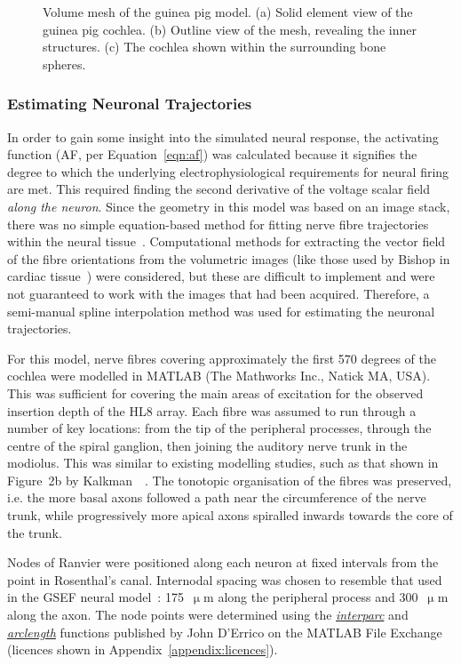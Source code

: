 \begin{figure}
    \caption[Volume mesh of the guinea pig model]{Volume mesh of the guinea pig
    model. (a) Solid element view of the guinea pig cochlea. (b) Outline
    view of the mesh, revealing the inner structures. (c) The cochlea shown
    within the surrounding bone spheres.}
	\label{fig:gp_mesh}
\end{figure}

\subsubsection{Estimating Neuronal Trajectories}

In order to gain some insight into the simulated neural response, the activating
function (AF, per Equation~\ref{eqn:af}) was calculated because it signifies the
degree to which the underlying electrophysiological requirements for neural
firing are met. This required finding the second derivative of the voltage
scalar field \emph{along the neuron}. Since the geometry in this model was based
on an image stack, there was no simple equation-based method for fitting nerve
fibre trajectories within the neural tissue~\cite{escude2006}. Computational
methods for extracting the vector field of the fibre orientations from the
volumetric images (like those used by Bishop in cardiac
tissue~\cite{bishop2010}) were considered, but these are difficult to implement
and were not guaranteed to work with the images that had been acquired.
Therefore, a semi-manual spline interpolation method was used for estimating the
neuronal trajectories.

For this model, nerve fibres covering approximately the first 570 degrees of the
cochlea were modelled in MATLAB (The Mathworks Inc., Natick MA, USA). This was
sufficient for covering the main areas of excitation for the observed insertion
depth of the HL8 array. Each fibre was assumed to run through a number of key
locations: from the tip of the peripheral processes, through the centre of the
spiral ganglion, then joining the auditory nerve trunk in the modiolus. This was
similar to existing modelling studies, such as that shown in Figure~2b by
Kalkman~\etal{}~\cite{kalkman2014}. The tonotopic organisation of the fibres was
preserved, i.e. the more basal axons followed a path near the circumference of
the nerve trunk, while progressively more apical axons spiralled inwards towards
the core of the trunk.

Nodes of Ranvier were positioned along each neuron at fixed intervals from the
point in Rosenthal's canal. Internodal spacing was chosen to resemble that used
in the GSEF neural model~\cite{frijns1995}: 175~$ \upmu $m along the peripheral
process and 300~$ \upmu $m along the axon. The node points were determined
using the
\href{http://in.mathworks.com/matlabcentral/fileexchange/34874-interparc}{\emph{interparc}}
and
\href{http://au.mathworks.com/matlabcentral/fileexchange/34871-arclength}{\emph{arclength}}
functions published by John D'Errico on the MATLAB File Exchange (licences
shown in Appendix~\ref{appendix:licences}).

